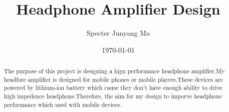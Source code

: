 \documentclass[a4paper,12pt ]{report}
\title{  Headphone Amplifier Design	 }
\author{Specter  Junyang Ma}
\date{\today}
\begin{document}
 

\begin{abstract}
	The purpose of this project is designing a hign performance headphone amplifier.My headfore amplifier is designed for mobile phones or mobile players.These devices are powered by lithium-ion battery which cause they don't have enough ability to drive high impedence headphone.Therefore, the aim for my design to imporve headphone performance which used with mobile devices.
\end{abstract}
\tableofcontents 
\listoffigures 

	






\end{document}
